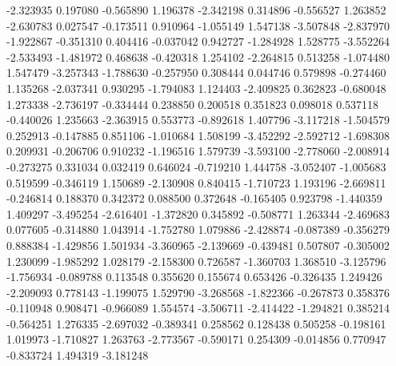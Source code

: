 -2.323935
0.197080
-0.565890
1.196378
-2.342198
0.314896
-0.556527
1.263852
-2.630783
0.027547
-0.173511
0.910964
-1.055149
1.547138
-3.507848
-2.837970
-1.922867
-0.351310
0.404416
-0.037042
0.942727
-1.284928
1.528775
-3.552264
-2.533493
-1.481972
0.468638
-0.420318
1.254102
-2.264815
0.513258
-1.074480
1.547479
-3.257343
-1.788630
-0.257950
0.308444
0.044746
0.579898
-0.274460
1.135268
-2.037341
0.930295
-1.794083
1.124403
-2.409825
0.362823
-0.680048
1.273338
-2.736197
-0.334444
0.238850
0.200518
0.351823
0.098018
0.537118
-0.440026
1.235663
-2.363915
0.553773
-0.892618
1.407796
-3.117218
-1.504579
0.252913
-0.147885
0.851106
-1.010684
1.508199
-3.452292
-2.592712
-1.698308
0.209931
-0.206706
0.910232
-1.196516
1.579739
-3.593100
-2.778060
-2.008914
-0.273275
0.331034
0.032419
0.646024
-0.719210
1.444758
-3.052407
-1.005683
0.519599
-0.346119
1.150689
-2.130908
0.840415
-1.710723
1.193196
-2.669811
-0.246814
0.188370
0.342372
0.088500
0.372648
-0.165405
0.923798
-1.440359
1.409297
-3.495254
-2.616401
-1.372820
0.345892
-0.508771
1.263344
-2.469683
0.077605
-0.314880
1.043914
-1.752780
1.079886
-2.428874
-0.087389
-0.356279
0.888384
-1.429856
1.501934
-3.360965
-2.139669
-0.439481
0.507807
-0.305002
1.230099
-1.985292
1.028179
-2.158300
0.726587
-1.360703
1.368510
-3.125796
-1.756934
-0.089788
0.113548
0.355620
0.155674
0.653426
-0.326435
1.249426
-2.209093
0.778143
-1.199075
1.529790
-3.268568
-1.822366
-0.267873
0.358376
-0.110948
0.908471
-0.966089
1.554574
-3.506711
-2.414422
-1.294821
0.385214
-0.564251
1.276335
-2.697032
-0.389341
0.258562
0.128438
0.505258
-0.198161
1.019973
-1.710827
1.263763
-2.773567
-0.590171
0.254309
-0.014856
0.770947
-0.833724
1.494319
-3.181248
